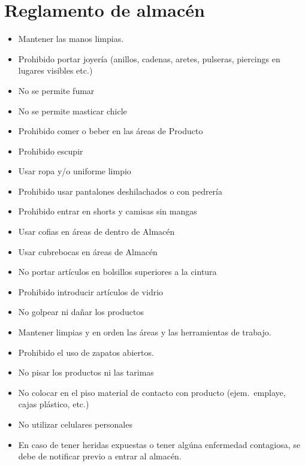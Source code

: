 \thispagestyle{formato-PI}
\renewcommand{\MayorVer}{2}
\renewcommand{\MenorVer}{0}
\renewcommand{\Codigo}{BPD-5-CI/CE}
\renewcommand{\FechaPub}{2023--01}
\renewcommand{\Titulo}{Reglamento de almacén}
\section{\Titulo}

\begin{itemize}
	\item Mantener las manos limpias.
	\item Prohibido portar joyería (anillos, cadenas, aretes, pulseras, piercings en lugares visibles etc.)
	\item No se permite fumar
	\item No se permite masticar chicle
	\item Prohibido comer o beber en las áreas de Producto
	\item Prohibido escupir
	\item Usar ropa y/o uniforme limpio
	\item Prohibido usar pantalones deshilachados o con pedrería
	\item Prohibido entrar en shorts y camisas sin mangas
	\item Usar cofias en áreas de dentro de Almacén
	\item Usar cubrebocas en áreas de Almacén
	\item No portar artículos en bolsillos superiores a la cintura
	\item Prohibido introducir artículos de vidrio
	\item No golpear ni dañar los productos
	\item Mantener limpias y en orden las áreas y las herramientas de trabajo.
	\item Prohibido el uso de zapatos abiertos.
	\item No pisar los productos ni las tarimas
	\item No colocar en el piso material de contacto con producto (ejem.\ emplaye, cajas plástico, etc.)
	\item No utilizar celulares personales
	\item En caso de tener heridas expuestas o tener algúna enfermedad contagiosa, se debe de notificar previo a entrar al almacén.
\end{itemize}

